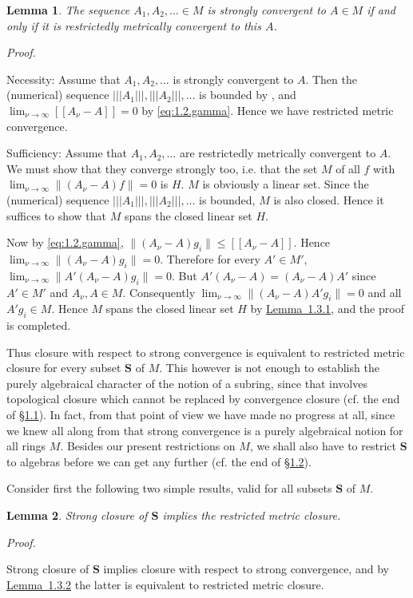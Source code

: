 \documentclass[b5paper,twoside]{article}
\newcommand{\secref}[2]{\hyperref[#1]{\mbox{\S#2}}}
\newcommand{\lemref}[2]{\hyperref[#1]{\mbox{Lemma~#2}}}
\theoremstyle{mvnplain}
\newtheorem{lemma}{Lemma}[section]
\renewenvironment{proof}[1][Proof]{%
  \par\addvspace{0.35\baselineskip}%
  \noindent\textit{#1.}\ \normalfont\ignorespaces
}{%
  \par\addvspace{0.35\baselineskip}%
}
\newcommand{\M}{\mathbf M}
\newcommand{\Hilbert}{\mathfrak H}
\newcommand{\Metric}[1]{\left[\!\left[#1\right]\!\right]}
\newcommand{\OpNorm}[1]{\left\lvert\left\lvert\left\lvert#1\right\rvert\right\rvert\right\rvert}
\def\M{M}%
\def\Hilbert{H}%
\def\Metric#1{[[#1]]}%
\def\mathfrak#1{#1}%
\begin{document}
\begin{lemma}\label{lem:1.3.2}
The sequence $A_1,A_2,\ldots\in\M$ is strongly convergent to $A\in\M$ if and
only if it is restrictedly metrically convergent to this $A$.
\end{lemma}
\begin{proof}
Necessity: Assume that $A_1,A_2,\ldots$ is strongly convergent to $A$.  Then
the (numerical) sequence $\OpNorm{A_1},\OpNorm{A_2},\ldots$ is bounded by
\cite[p.~382, footnote~35]{ref2}, and
$\lim_{\nu\to\infty}\Metric{A_\nu-A}=0$ by \eqref{eq:1.2.gamma}.  Hence we
have restricted metric convergence.

Sufficiency: Assume that $A_1,A_2,\ldots$ are restrictedly metrically
convergent to $A$.  We must show that they converge strongly too, i.e. that the
set $\mathfrak M$ of all $f$ with
$\lim_{\nu\to\infty}\lVert(A_\nu-A)f\rVert=0$ is $\Hilbert$.
$\mathfrak M$ is obviously a linear set.  Since the (numerical) sequence
$\OpNorm{A_1},\OpNorm{A_2},\ldots$ is bounded, $\mathfrak M$ is also closed.
Hence it suffices to show that $\mathfrak M$ spans the closed linear set
$\Hilbert$.

Now by \eqref{eq:1.2.gamma},
$\lVert(A_\nu-A)g_i\rVert\leq\Metric{A_\nu-A}$.  Hence
$\lim_{\nu\to\infty}\lVert(A_\nu-A)g_i\rVert=0$.  Therefore for every
$A'\in\M'$, $\lim_{\nu\to\infty}\lVert A'(A_\nu-A)g_i\rVert=0$.  But
$A'(A_\nu-A)=(A_\nu-A)A'$ since $A'\in\M'$ and $A_\nu,A\in\M$.
Consequently
$\lim_{\nu\to\infty}\lVert(A_\nu-A)A'g_i\rVert=0$ and all
$A'g_i\in\mathfrak M$.  Hence $\mathfrak M$ spans the closed linear set
$\Hilbert$ by \lemref{lem:1.3.1}{1.3.1}, and the proof is completed.
\end{proof}

Thus closure with respect to strong convergence is equivalent to restricted
metric closure for every subset $\mathbf S$ of $\M$.  This however is not enough
to establish the purely algebraical character of the notion of a subring, since
that involves topological closure which cannot be replaced by convergence
closure (cf. the end of \secref{sec:1.1}{1.1}).  In fact, from that point of view
we have made no progress at all, since we knew all along from \cite{ref9} that
strong convergence is a purely algebraical notion for all rings $\M$.  Besides
our present restrictions on $\M$, we shall also have to restrict $\mathbf S$ to
algebras before we can get any further (cf. the end of \secref{sec:1.2}{1.2}).

Consider first the following two simple results, valid for all subsets
$\mathbf S$ of $\M$.
\begin{lemma}\label{lem:1.4.1}
Strong closure of $\mathbf S$ implies the restricted metric closure.
\end{lemma}
\begin{proof}
Strong closure of $\mathbf S$ implies closure with respect to strong convergence,
and by \lemref{lem:1.3.2}{1.3.2} the latter is equivalent to restricted metric
closure.
\end{proof}
\end{document}
